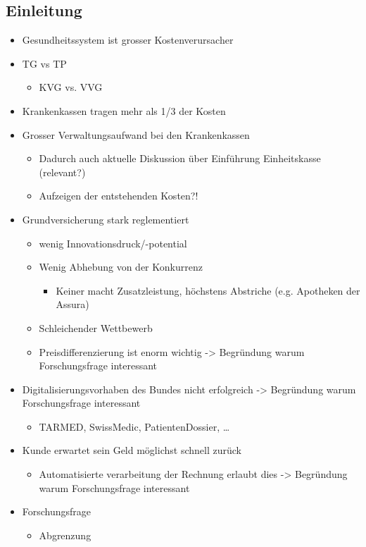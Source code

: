 \documentclass{hwz}
\begin{document}
\subsection{Einleitung}
\begin{itemize}
    \item Gesundheitssystem ist grosser Kostenverursacher
    \item TG vs TP
    \begin{itemize}
         \item KVG vs. VVG
    \end{itemize}
	 \item Krankenkassen tragen mehr als 1/3 der Kosten
	 \item Grosser Verwaltungsaufwand bei den Krankenkassen
     \begin{itemize}
        \item Dadurch auch aktuelle Diskussion über Einführung Einheitskasse (relevant?)
        \item Aufzeigen der entstehenden Kosten?!
    \end{itemize}
	\item Grundversicherung stark reglementiert
    \begin{itemize}
        \item wenig Innovationsdruck/-potential
        \item Wenig Abhebung von der Konkurrenz
        \begin{itemize}
			\item Keiner macht Zusatzleistung, höchstens Abstriche (e.g. Apotheken der Assura)
        \end{itemize}
        \item Schleichender Wettbewerb
        \item Preisdifferenzierung ist enorm wichtig -> Begründung warum Forschungsfrage interessant
    \end{itemize}
	\item Digitalisierungsvorhaben des Bundes nicht erfolgreich -> Begründung warum Forschungsfrage interessant
    \begin{itemize}
        \item TARMED, SwissMedic, PatientenDossier, …
    \end{itemize}
    \item Kunde erwartet sein Geld möglichst schnell zurück
    \begin{itemize}
        \item Automatisierte verarbeitung der Rechnung erlaubt dies  -> Begründung warum Forschungsfrage interessant
    \end{itemize}
    \item Forschungsfrage
    \begin{itemize}
        \item Abgrenzung
    \end{itemize}
\end{itemize}
	
\end{document}
